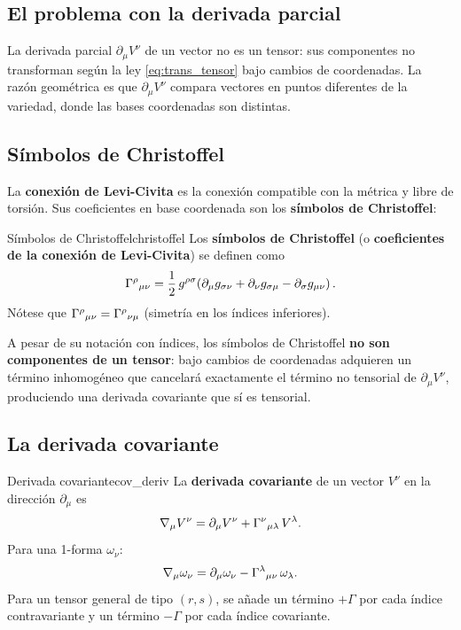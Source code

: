 \subsection{El problema con la derivada parcial}

La derivada parcial $\partial_\mu V^\nu$ de un vector no es un tensor: sus componentes no transforman según la ley \eqref{eq:trans_tensor} bajo cambios de coordenadas. La razón geométrica es que $\partial_\mu V^\nu$ compara vectores en puntos diferentes de la variedad, donde las bases coordenadas son distintas.

\subsection{Símbolos de Christoffel}

La \textbf{conexión de Levi-Civita} es la conexión compatible con la métrica y libre de torsión. Sus coeficientes en base coordenada son los \textbf{símbolos de Christoffel}:

\begin{definicion}{Símbolos de Christoffel}{christoffel}
Los \textbf{símbolos de Christoffel} (o \textbf{coeficientes de la conexión de Levi-Civita}) se definen como
\begin{equation}
  \Gamma^{\rho}{}_{\mu \nu} = \frac{1}{2}\, g^{\rho\sigma}\!\left(
    \partial_\mu g_{\sigma\nu}
    + \partial_\nu g_{\sigma\mu}
    - \partial_\sigma g_{\mu\nu}
  \right).
  \label{eq:christoffel}
\end{equation}
Nótese que $\Gamma^{\rho}{}_{\mu \nu} = \Gamma^{\rho}{}_{\nu \mu}$ (simetría en los índices inferiores).
\end{definicion}

\begin{importante}
A pesar de su notación con índices, los símbolos de Christoffel \textbf{no son componentes de un tensor}: bajo cambios de coordenadas adquieren un término inhomogéneo que cancelará exactamente el término no tensorial de $\partial_\mu V^\nu$, produciendo una derivada covariante que sí es tensorial.
\end{importante}

\subsection{La derivada covariante}

\begin{definicion}{Derivada covariante}{cov_deriv}
La \textbf{derivada covariante} de un vector $V^\nu$ en la dirección $\partial_\mu$ es
\begin{equation}
  \nabla_\mu V^\nu = \partial_\mu V^\nu + \Gamma^{\nu}{}_{\mu \lambda}\, V^\lambda.
  \label{eq:cov_vec}
\end{equation}
Para una 1-forma $\omega_\nu$:
\begin{equation}
  \nabla_\mu \omega_\nu = \partial_\mu \omega_\nu - \Gamma^{\lambda}{}_{\mu \nu}\, \omega_\lambda.
  \label{eq:cov_form}
\end{equation}
Para un tensor general de tipo $(r,s)$, se añade un término $+\Gamma$ por cada índice contravariante y un término $-\Gamma$ por cada índice covariante.
\end{definicion}

